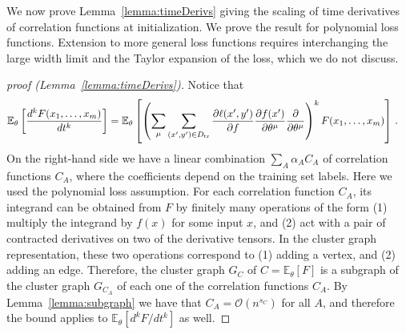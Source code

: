 \documentclass[english]{article}
\newcommand{\cO}{\ensuremath{\mathcal{O}}}
\newcommand{\lexpp}[1]{\mathbb{E}_{#1}\left[}
\newcommand{\rexp}{\right]}
\begin{document}
We now prove Lemma~\ref{lemma:timeDerivs} giving the scaling of time derivatives of correlation functions at initialization. We prove the result for polynomial loss functions. Extension to more general loss functions requires interchanging the large width limit and the Taylor expansion of the loss, which we do not discuss.
\begin{proof}[proof (Lemma~\ref{lemma:timeDerivs})]
  Notice that
  \begin{align}
    \lexpp{\theta}\frac{d^{k} F(x_1,\ldots,x_m)}{d t^k}\rexp &=
    \lexpp{\theta}
    \left(\sum_\mu \sum_{(x',y')\in D_{\rm tr}}\frac{\partial\ell(x',y')}{\partial f}\frac{\partial f(x')}{\partial\theta^{\mu}}\frac{\partial}{\partial\theta^{\mu}}\right)^{k}F(x_1,\ldots,x_m)
    \rexp\,.
  \end{align}
  On the right-hand side we have a linear combination $\sum_A \alpha_A C_A$ of correlation functions $C_A$, where the coefficients depend on the training set labels.
  Here we used the polynomial loss assumption.
  For each correlation function $C_A$, its integrand can be obtained from $F$ by finitely many operations of the form (1) multiply the integrand by $f(x)$ for some input $x$, and (2) act with a pair of contracted derivatives on two of the derivative tensors.
  In the cluster graph representation, these two operations correspond to (1) adding a vertex, and (2) adding an edge.
  Therefore, the cluster graph $G_C$ of $C = \lexpp{\theta} F \rexp$ is a subgraph of the cluster graph $G_{C_A}$ of each one of the correlation functions $C_A$.
  By Lemma~\ref{lemma:subgraph} we have that $C_A = \cO(n^{s_C})$ for all $A$, and therefore the bound applies to $\lexpp{\theta} d^kF/dt^k \rexp$ as well.
\end{proof}
\end{document}
